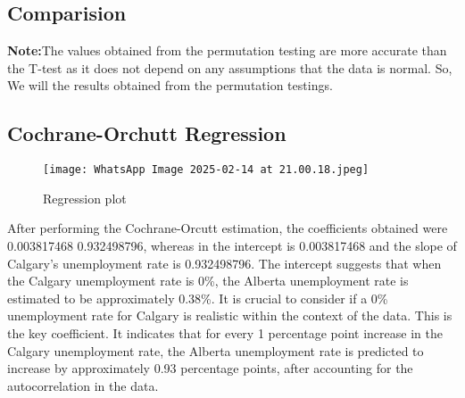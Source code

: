 \documentclass[11pt]{article}
\begin{document}
\subsection{Comparision}
\begin{table}[h]
    \centering
    \textwidth=5in 
    \caption{Confidence interval from permutations vs confidence interval from t-test}
    \label{tab:confidence_intervals}
\end{table}
\textbf{Note:}The values obtained from the permutation testing are more accurate than the T-test as it does not depend on any assumptions that the data is normal. So, We will the results obtained from the permutation testings.
\subsection{Cochrane-Orchutt Regression}
\begin{figure}[H]
    \centering
    \texttt{[image: WhatsApp Image 2025-02-14 at 21.00.18.jpeg]}
    \caption{Regression plot}
    \label{fig:enter-label}
\end{figure}
After performing the Cochrane-Orcutt estimation, the coefficients obtained were 0.003817468 0.932498796, whereas in the 
intercept is 0.003817468 and the slope of Calgary's unemployment rate is 0.932498796.\newline
The intercept suggests that when the Calgary unemployment rate is 0\%, the Alberta unemployment rate is estimated to be approximately 0.38\%.  It is crucial to consider if a 0\% unemployment rate for Calgary is realistic within the context of the data.
This is the key coefficient. It indicates that for every 1 percentage point increase in the Calgary unemployment rate, the Alberta unemployment rate is predicted to increase by approximately 0.93 percentage points, after accounting for the autocorrelation in the data.
\end{document}
